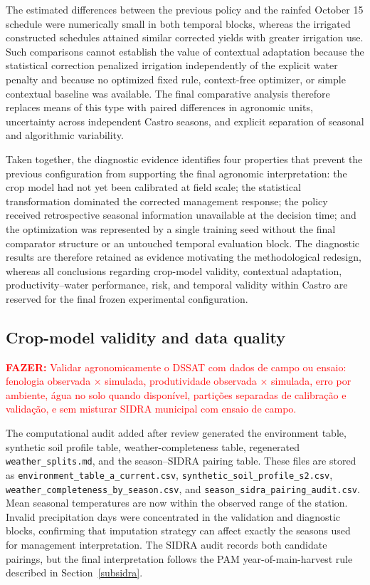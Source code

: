 \documentclass[times,final,authoryear]{elsarticle}
\begin{document}
The estimated differences between the previous policy and the rainfed October 15 schedule were numerically small in both temporal blocks, whereas the irrigated constructed schedules attained similar corrected yields with greater irrigation use. Such comparisons cannot establish the value of contextual adaptation because the statistical correction penalized irrigation independently of the explicit water penalty and because no optimized fixed rule, context-free optimizer, or simple contextual baseline was available. The final comparative analysis therefore replaces means of this type with paired differences in agronomic units, uncertainty across independent Castro seasons, and explicit separation of seasonal and algorithmic variability.

Taken together, the diagnostic evidence identifies four properties that prevent the previous configuration from supporting the final agronomic interpretation: the crop model had not yet been calibrated at field scale; the statistical transformation dominated the corrected management response; the policy received retrospective seasonal information unavailable at the decision time; and the optimization was represented by a single training seed without the final comparator structure or an untouched temporal evaluation block. The diagnostic results are therefore retained as evidence motivating the methodological redesign, whereas all conclusions regarding crop-model validity, contextual adaptation, productivity--water performance, risk, and temporal validity within Castro are reserved for the final frozen experimental configuration.

\subsection{Crop-model validity and data quality}
\label{subres_validity}

\textcolor{red}{\textbf{FAZER:} Validar agronomicamente o DSSAT com dados de campo ou ensaio: fenologia observada $\times$ simulada, produtividade observada $\times$ simulada, erro por ambiente, água no solo quando disponível, partições separadas de calibração e validação, e sem misturar SIDRA municipal com ensaio de campo.}

The computational audit added after review generated the environment table, synthetic soil profile table, weather-completeness table, regenerated \texttt{weather\_splits.md}, and the season--SIDRA pairing table. These files are stored as \texttt{environment\_table\_a\_current.csv}, \texttt{synthetic\_soil\_profile\_s2.csv}, \texttt{weather\_completeness\_by\_season.csv}, and \texttt{season\_sidra\_pairing\_audit.csv}. Mean seasonal temperatures are now within the observed range of the station. Invalid precipitation days were concentrated in the validation and diagnostic blocks, confirming that imputation strategy can affect exactly the seasons used for management interpretation. The SIDRA audit records both candidate pairings, but the final interpretation follows the PAM year-of-main-harvest rule described in Section~\ref{subsidra}.
\end{document}
